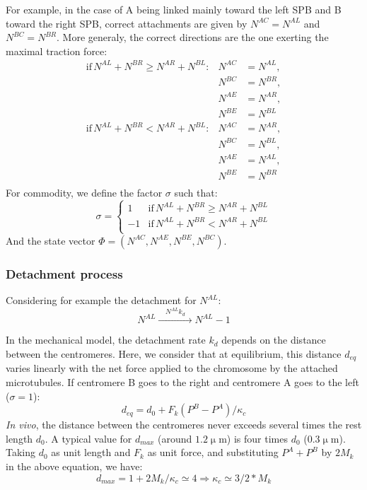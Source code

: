 \documentclass[a4paper,12pt]{article}
\newcommand{\UM}{\upmu\mbox{m}}
\renewcommand{\geq}{\geqslant}
\begin{document}
For example, in the case of A being linked mainly toward the left SPB
and B toward the right SPB, correct attachments are given by $ N^{AC}
= N^{AL}$ and $N^{BC} = N^{BR}$. More generaly, the correct directions
are the one exerting the maximal traction force:
\begin{equation}
  \label{eq:corect_erron}
  \begin{aligned}
    \mathrm{if}\, N^{AL} +  N^{BR} \geq N^{AR} +  N^{BL}:& N^{AC}&= N^{AL},\\
                                                      &  N^{BC}&= N^{BR},\\
                                                      &  N^{AE}&= N^{AR},\\
                                                      &  N^{BE}&= N^{BL}\\
    \mathrm{if}\, N^{AL} +  N^{BR} < N^{AR} +  N^{BL}  :&  N^{AC}&= N^{AR},\\
                                                      &  N^{BC}&= N^{BL},\\
                                                      &  N^{AE}&= N^{AL},\\
                                                      &  N^{BE}&= N^{BR}\\
  \end{aligned}
\end{equation}
For commodity, we define the factor $\sigma$ such that:
\begin{equation}
  \label{eq:factS}
  \sigma =%
  \begin{cases}
    1 &\mathrm{if}\, N^{AL} +  N^{BR} \geq N^{AR} +  N^{BL}\\
    -1 &\mathrm{if}\, N^{AL} +  N^{BR} < N^{AR} +  N^{BL}\\
  \end{cases}
\end{equation}
And the state vector $\Phi = \left(N^{AC}, N^{AE}, N^{BE}, N^{BC}\right)$.


\subsubsection{Detachment process}

Considering for example the detachment for $N^{AL}$:
\begin{equation}
    N^{AL} \xrightarrow{\quad N^{AL}k_d \quad} N^{AL}- 1%
\end{equation}

In the mechanical model, the detachment rate $k_d$ depends on the
distance between the centromeres. Here, we consider that at
equilibrium, this distance $d_{eq}$ varies linearly with the net force
applied to the chromosome by the attached microtubules. If centromere
B goes to the right and centromere A goes to the left ($\sigma = 1$):
$$ d_{eq} = d_0 + F_k (P^B - P^A)/\kappa_c$$
\emph{In vivo}, the distance between the centromeres
never exceeds several times the rest length $d_0$. A typical value for
$d_{max}$ (around $1.2 \UM$) is four times $d_0$ ($0.3 \UM$). Taking
$d_0$ as unit length and $F_k$ as unit force, and substituting $P^A +
P^B$ by $2M_k$ in the above equation, we have:
$$ 
d_{max} = 1 + 2M_k/\kappa_c  \simeq 4 \Rightarrow \kappa_c \simeq 3/2*M_k
$$
\end{document}
